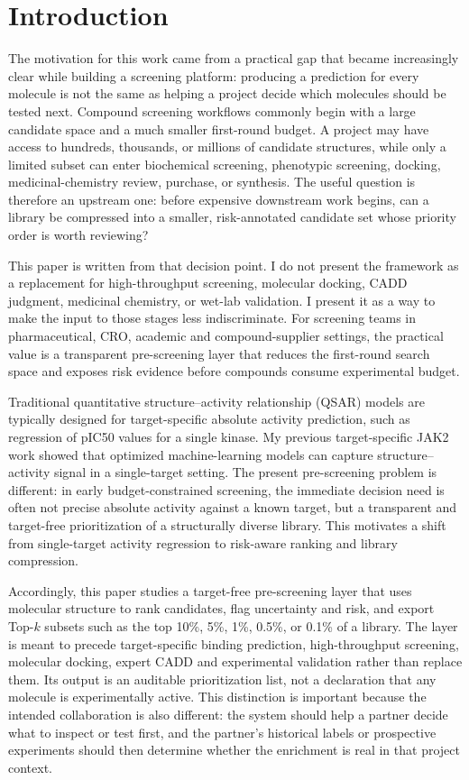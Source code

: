 \documentclass[manuscript=article]{achemso}
\begin{document}
\section{Introduction}
The motivation for this work came from a practical gap that became increasingly
clear while building a screening platform: producing a prediction for every
molecule is not the same as helping a project decide which molecules should be
tested next. Compound screening workflows commonly begin with a large
candidate space and a much smaller first-round budget. A project may have
access to hundreds, thousands, or millions of candidate structures, while only
a limited subset can enter biochemical screening, phenotypic screening,
docking, medicinal-chemistry review, purchase, or synthesis. The useful
question is therefore an upstream one: before expensive downstream work begins,
can a library be compressed into a smaller, risk-annotated candidate set whose
priority order is worth reviewing?

This paper is written from that decision point. I do not present the framework
as a replacement for high-throughput screening, molecular docking, CADD
judgment, medicinal chemistry, or wet-lab validation. I present it as a way to
make the input to those stages less indiscriminate. For screening teams in
pharmaceutical, CRO, academic and compound-supplier settings, the practical
value is a transparent pre-screening layer that reduces the first-round search
space and exposes risk evidence before compounds consume experimental budget.

Traditional quantitative structure--activity relationship (QSAR) models are
typically designed for target-specific absolute activity prediction, such as
regression of pIC50 values for a single kinase. My previous target-specific
JAK2 work \cite{Liang2025JAK2} showed that optimized machine-learning models
can capture structure--activity signal in a single-target setting. The present
pre-screening problem is different: in early
budget-constrained screening, the immediate decision need is often not precise
absolute activity against a known target, but a transparent and target-free
prioritization of a structurally diverse library. This motivates a shift from
single-target activity regression to risk-aware ranking and library compression.

Accordingly, this paper studies a target-free pre-screening layer that uses
molecular structure to rank candidates, flag uncertainty and risk, and export
Top-$k$ subsets such as the top 10\%, 5\%, 1\%, 0.5\%, or 0.1\% of a library.
The layer is meant to precede target-specific binding prediction,
high-throughput screening, molecular docking, expert CADD and experimental
validation rather than replace them. Its output is an auditable prioritization
list, not a declaration that any molecule is experimentally active. This
distinction is important because the intended collaboration is also different:
the system should help a partner decide what to inspect or test first, and the
partner's historical labels or prospective experiments should then determine
whether the enrichment is real in that project context.
\end{document}
